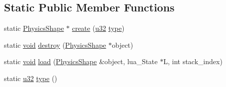 \subsection*{Static Public Member Functions}
\begin{DoxyCompactItemize}
\item 
static \mbox{\hyperlink{classnjli_1_1_physics_shape}{Physics\+Shape}} $\ast$ \mbox{\hyperlink{classnjli_1_1_physics_shape_a701dbac9216cbda5493851634ade84c3}{create}} (\mbox{\hyperlink{_util_8h_a10e94b422ef0c20dcdec20d31a1f5049}{u32}} \mbox{\hyperlink{classnjli_1_1_physics_shape_a2d21f55f6e742bddb5b5fc44223f96fb}{type}})
\item 
static \mbox{\hyperlink{_thread_8h_af1e856da2e658414cb2456cb6f7ebc66}{void}} \mbox{\hyperlink{classnjli_1_1_physics_shape_ac3f7a072f33f984a3bac11b2c9191167}{destroy}} (\mbox{\hyperlink{classnjli_1_1_physics_shape}{Physics\+Shape}} $\ast$object)
\item 
static \mbox{\hyperlink{_thread_8h_af1e856da2e658414cb2456cb6f7ebc66}{void}} \mbox{\hyperlink{classnjli_1_1_physics_shape_aaf889e6e5bc193fb8c5518a3a4c48f9c}{load}} (\mbox{\hyperlink{classnjli_1_1_physics_shape}{Physics\+Shape}} \&object, lua\+\_\+\+State $\ast$L, int stack\+\_\+index)
\item 
static \mbox{\hyperlink{_util_8h_a10e94b422ef0c20dcdec20d31a1f5049}{u32}} \mbox{\hyperlink{classnjli_1_1_physics_shape_a2d21f55f6e742bddb5b5fc44223f96fb}{type}} ()
\end{DoxyCompactItemize}
